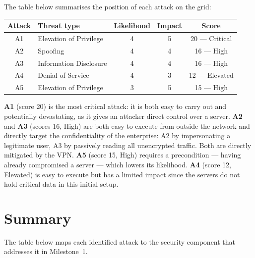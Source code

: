 \documentclass[a4paper,12pt]{article}
\begin{document}
\medskip
\noindent
The table below summarises the position of each attack on the grid:

\begin{center}
\begin{tabular}{clccc}
  \toprule
  \textbf{Attack} & \textbf{Threat type} & \textbf{Likelihood}
    & \textbf{Impact} & \textbf{Score} \\
  \midrule
  A1 & Elevation of Privilege & 4 & 5 & 20 --- Critical \\
  A2 & Spoofing               & 4 & 4 & 16 --- High     \\
  A3 & Information Disclosure & 4 & 4 & 16 --- High     \\
  A4 & Denial of Service      & 4 & 3 & 12 --- Elevated \\
  A5 & Elevation of Privilege & 3 & 5 & 15 --- High     \\
  \bottomrule
\end{tabular}
\end{center}

\medskip\noindent
\textbf{A1} (score 20) is the most critical attack: it is both easy
to carry out and potentially devastating, as it gives an attacker
direct control over a server. \textbf{A2} and \textbf{A3} (scores 16,
High) are both easy to execute from outside the network and directly
target the confidentiality of the enterprise: A2 by impersonating a
legitimate user, A3 by passively reading all unencrypted traffic.
Both are directly mitigated by the VPN. \textbf{A5}
(score 15, High) requires a precondition --- having already compromised
a server --- which lowers its likelihood. \textbf{A4} (score 12, Elevated) is easy to
execute but has a limited impact since the servers do not hold
critical data in this initial setup.

\section{Summary}

The table below maps each identified attack to the security component
that addresses it in Milestone~1.
\end{document}
